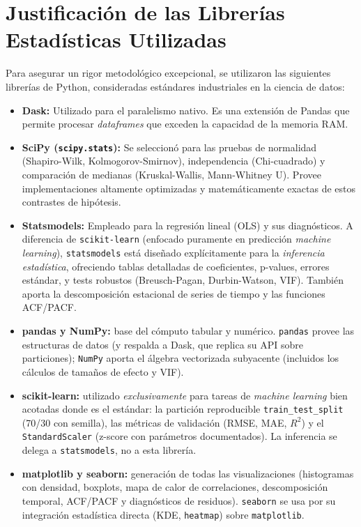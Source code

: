 \documentclass[12pt,letterpaper]{article}
\begin{document}
\section{Justificación de las Librerías Estadísticas Utilizadas}
Para asegurar un rigor metodológico excepcional, se utilizaron las siguientes librerías de Python, consideradas estándares industriales en la ciencia de datos:
\begin{itemize}
    \item \textbf{Dask:} Utilizado para el paralelismo nativo. Es una extensión de Pandas que permite procesar \textit{dataframes} que exceden la capacidad de la memoria RAM.
    \item \textbf{SciPy (\texttt{scipy.stats}):} Se seleccionó para las pruebas de normalidad (Shapiro-Wilk, Kolmogorov-Smirnov), independencia (Chi-cuadrado) y comparación de medianas (Kruskal-Wallis, Mann-Whitney U). Provee implementaciones altamente optimizadas y matemáticamente exactas de estos contrastes de hipótesis.
    \item \textbf{Statsmodels:} Empleado para la regresión lineal (OLS) y sus diagnósticos. A diferencia de \texttt{scikit-learn} (enfocado puramente en predicción \textit{machine learning}), \texttt{statsmodels} está diseñado explícitamente para la \textit{inferencia estadística}, ofreciendo tablas detalladas de coeficientes, p-values, errores estándar, y tests robustos (Breusch-Pagan, Durbin-Watson, VIF). También aporta la descomposición estacional de series de tiempo y las funciones ACF/PACF.
    \item \textbf{pandas y NumPy:} base del cómputo tabular y numérico. \texttt{pandas} provee las estructuras de datos (y respalda a Dask, que replica su API sobre particiones); \texttt{NumPy} aporta el álgebra vectorizada subyacente (incluidos los cálculos de tamaños de efecto y VIF).
    \item \textbf{scikit-learn:} utilizado \textit{exclusivamente} para tareas de \textit{machine learning} bien acotadas donde es el estándar: la partición reproducible \texttt{train\_test\_split} (70/30 con semilla), las métricas de validación (RMSE, MAE, $R^2$) y el \texttt{StandardScaler} (z-score con parámetros documentados). La inferencia se delega a \texttt{statsmodels}, no a esta librería.
    \item \textbf{matplotlib y seaborn:} generación de todas las visualizaciones (histogramas con densidad, boxplots, mapa de calor de correlaciones, descomposición temporal, ACF/PACF y diagnósticos de residuos). \texttt{seaborn} se usa por su integración estadística directa (KDE, \texttt{heatmap}) sobre \texttt{matplotlib}.
\end{itemize}
\end{document}
